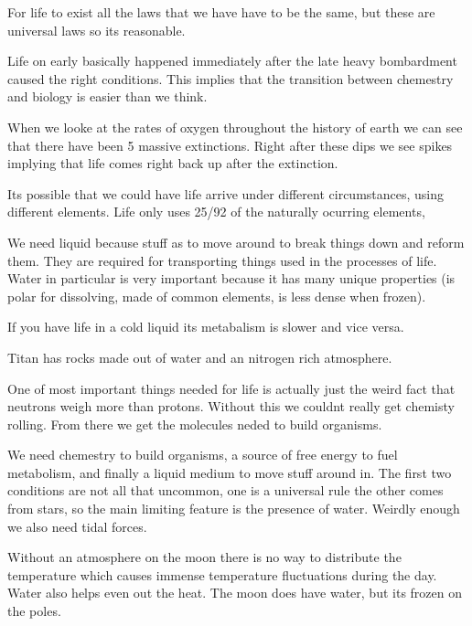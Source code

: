 \documentclass{article}
\begin{document}

For life to exist all the laws that we have have to be the same, but these are universal laws so its reasonable.


Life on early basically happened immediately after the late heavy bombardment caused the right conditions. This implies that the transition between chemestry and biology is easier than we think.


When we looke at the rates of oxygen throughout the history of earth we can see that there have been 5 massive extinctions. Right after these dips we see spikes implying that life comes right back up after the extinction.





Its possible that we could have life arrive under different circumstances, using different elements. Life only uses 25/92 of the naturally ocurring elements,


We need liquid because stuff as to move around to break things down and reform them. They are required for transporting things used in the processes of life. Water in particular is very important because it has many unique properties (is polar for dissolving, made of common elements, is less dense when frozen).


If you have life in a cold liquid its metabalism is slower and vice versa.


Titan has rocks made out of water and an nitrogen rich atmosphere.


One of most important things needed for life is actually just the weird fact that neutrons weigh more than protons. Without this we couldnt really get chemisty rolling. From there we get the molecules neded to build organisms.


We need chemestry to build organisms, a source of free energy to fuel metabolism, and finally a liquid medium to move stuff around in. The first two conditions are not all that uncommon, one is a universal rule the other comes from stars, so the main limiting feature is the presence of water. Weirdly enough we also need tidal forces.


Without an atmosphere on the moon there is no way to distribute the temperature which causes immense temperature fluctuations during the day. Water also helps even out the heat. The moon does have water, but its frozen on the poles.
\end{document}
